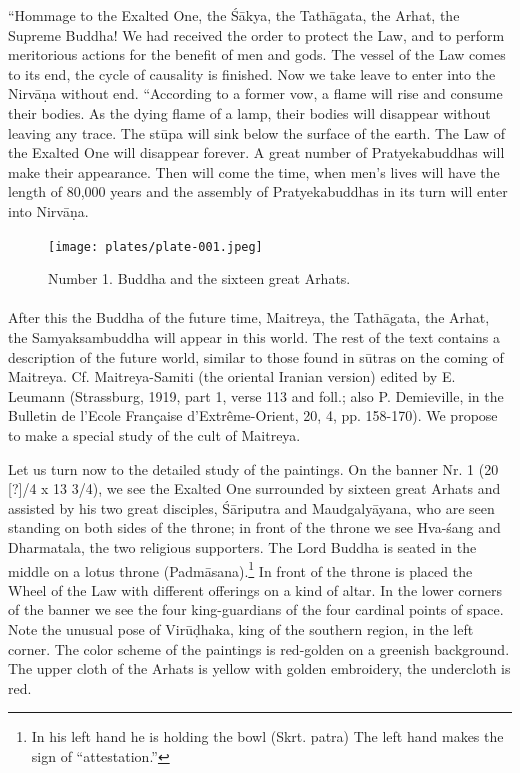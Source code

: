 \documentclass[a4paper, 12pt, oneside]{article}
\begin{document}
``Hommage to the Exalted One, the \'{S}\={a}kya, the Tath\={a}gata, the Arhat, the Supreme Buddha! We had received the order to protect the Law, and to perform meritorious actions for the benefit of men and gods. The vessel of the Law comes to its end, the cycle of causality is finished. Now we take leave to enter into the Nirv\={a}\d{n}a without end. ``According to a former vow, a flame will rise and consume their bodies. As the dying flame of a lamp, their bodies will disappear without leaving any trace. The st\={u}pa will sink below the surface of the earth. The Law of the Exalted One will disappear forever. A great number of Pratyekabuddhas will make their appearance. Then will come the time, when men's lives will have the length of 80,000 years and the assembly of Pratyekabuddhas in its turn will enter into Nirv\={a}\d{n}a.
\clearpage
\vspace*{\fill}
\begin{figure}[H]
\centering
\texttt{[image: plates/plate-001.jpeg]}
\caption*{Number 1. Buddha and the sixteen great Arhats.}
\end{figure}
\vspace*{\fill}
\clearpage
\paragraph{}
After this the Buddha of the future time, Maitreya, the Tath\={a}gata, the Arhat, the Samyaksambuddha will appear in this world. The rest of the text contains a description of the future world, similar to those found in s\={u}tras on the coming of Maitreya. Cf. Maitreya-Samiti (the oriental Iranian version) edited by E. Leumann (Strassburg, 1919, part 1, verse 113 and foll.; also P. Demieville, in the Bulletin de l'Ecole Française d'Extrême-Orient, 20, 4, pp. 158-170). We propose to make a special study of the cult of Maitreya.

Let us turn now to the detailed study of the paintings. On the banner Nr. 1 (20 [?]/4 x 13 3/4), we see the Exalted One surrounded by sixteen great Arhats and assisted by his two great disciples, \'{S}\={a}riputra and Maudgaly\={a}yana, who are seen standing on both sides of the throne; in front of the throne we see Hva-\'{s}ang and Dharmatala, the two religious supporters. The Lord Buddha is seated in the middle on a lotus throne (Padm\={a}sana).\footnote{In his left hand he is holding the bowl (Skrt. patra) The left hand makes the sign of ``attestation.''} In front of the throne is placed the Wheel of the Law with different offerings on a kind of altar. In the lower corners of the banner we see the four king-guardians of the four cardinal points of space. Note the unusual pose of Vir\={u}\d{d}haka, king of the southern region, in the left corner. The color scheme of the paintings is red-golden on a greenish background. The upper cloth of the Arhats is yellow with golden embroidery, the undercloth is red.
\end{document}
